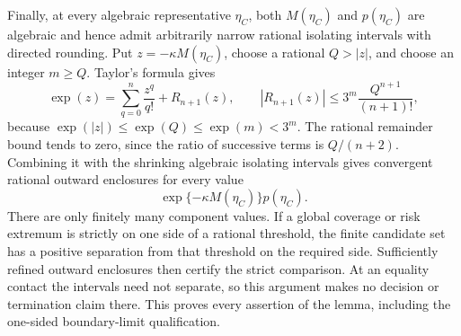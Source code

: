Finally, at every algebraic representative \(\eta_C\), both \(M(\eta_C)\) and \(p(\eta_C)\) are algebraic and hence admit arbitrarily narrow rational isolating intervals with directed rounding.  Put \(z=-\kappa M(\eta_C)\), choose a rational \(Q>|z|\), and choose an integer \(m\ge Q\).  Taylor's formula gives
\[
 \exp(z)=\sum_{q=0}^{n}\frac{z^q}{q!}+R_{n+1}(z),
 \qquad
 |R_{n+1}(z)|
 \le 3^m\frac{Q^{n+1}}{(n+1)!},
\]
because \(\exp(|z|)\le\exp(Q)\le\exp(m)<3^m\).  The rational remainder bound tends to zero, since the ratio of successive terms is \(Q/(n+2)\).  Combining it with the shrinking algebraic isolating intervals gives convergent rational outward enclosures for every value
\[
 \exp\{-\kappa M(\eta_C)\}p(\eta_C).
\]
There are only finitely many component values.  If a global coverage or risk extremum is strictly on one side of a rational threshold, the finite candidate set has a positive separation from that threshold on the required side.  Sufficiently refined outward enclosures then certify the strict comparison.  At an equality contact the intervals need not separate, so this argument makes no decision or termination claim there.  This proves every assertion of the lemma, including the one-sided boundary-limit qualification.
